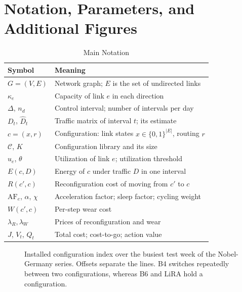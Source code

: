 \documentclass[preprint,12pt]{elsarticle}
\begin{document}
\section{Notation, Parameters, and Additional Figures}
\begin{table}[h!]
\centering
\caption{Main Notation}
\label{tab:notation}
\footnotesize
\setlength{\tabcolsep}{3pt}
\begin{tabular}{@{}p{1.85cm}p{6.5cm}@{}}
\toprule
Symbol & Meaning \\
\midrule
$G=(V,E)$ & Network graph; $E$ is the set of undirected links \\
$\kappa_e$ & Capacity of link $e$ in each direction \\
$\Delta$, $n_d$ & Control interval; number of intervals per day \\
$D_t$, $\hat D_t$ & Traffic matrix of interval $t$; its estimate \\
$c=(x,r)$ & Configuration: link states $x\in\{0,1\}^{|E|}$, routing $r$ \\
$\mathcal{C}$, $K$ & Configuration library and its size \\
$u_e$, $\theta$ & Utilization of link $e$; utilization threshold \\
$E(c,D)$ & Energy of $c$ under traffic $D$ in one interval \\
$R(c',c)$ & Reconfiguration cost of moving from $c'$ to $c$ \\
$\mathrm{AF}_e$, $\alpha$, $\chi$ & Acceleration factor; sleep factor; cycling weight \\
$W(c',c)$ & Per-step wear cost \\
$\lambda_R,\lambda_W$ & Prices of reconfiguration and wear \\
$J$, $V_t$, $Q_t$ & Total cost; cost-to-go; action value \\
\bottomrule
\end{tabular}
\end{table}

\begin{figure}[h!]
\centering
{}
\caption{Installed configuration index over the busiest test week of the Nobel-Germany series. Offsets separate the lines. B4 switches repeatedly between two configurations, whereas B6 and LiRA hold a configuration.}
\label{fig:case}
\end{figure}
\end{document}
